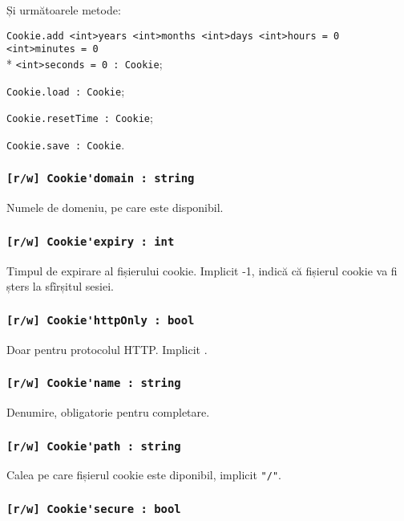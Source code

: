 Și următoarele metode:
\begin{icItems}
	\item \lstinline|Cookie.add <int>years <int>months <int>days <int>hours = 0 <int>minutes = 0|\\* \lstinline|<int>seconds = 0 : Cookie|;
	\item \lstinline|Cookie.load : Cookie|;
	\item \lstinline|Cookie.resetTime : Cookie|;
	\item \lstinline|Cookie.save : Cookie|.
\end{icItems}

\subsubsection{\lstinline|[r/w] Cookie'domain : string|}

Numele de domeniu, pe care \cookie{} este disponibil.

\subsubsection{\lstinline|[r/w] Cookie'expiry : int|}

Timpul de expirare al fișierului cookie. Implicit -1, indică că fișierul cookie va fi șters la sfîrșitul sesiei.

\subsubsection{\lstinline|[r/w] Cookie'httpOnly : bool|}

Doar pentru protocolul HTTP. Implicit \false.

\subsubsection{\lstinline|[r/w] Cookie'name : string|}

Denumire, obligatorie pentru completare.

\subsubsection{\lstinline|[r/w] Cookie'path : string|}

Calea pe care fișierul cookie este diponibil, implicit \lstinline|"/"|.

\subsubsection{\lstinline|[r/w] Cookie'secure : bool|}

